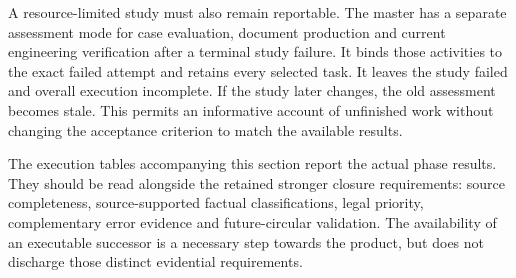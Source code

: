 A resource-limited study must also remain reportable. The master has a separate
assessment mode for case evaluation, document production and current engineering
verification after a terminal study failure. It binds those activities to the
exact failed attempt and retains every selected task. It leaves the study
failed and overall execution incomplete. If the study later changes, the old
assessment becomes stale. This permits an informative account of unfinished
work without changing the acceptance criterion to match the available results.

The execution tables accompanying this section report the actual phase results.
They should be read alongside the retained stronger closure requirements:
source completeness, source-supported factual classifications, legal priority,
complementary error evidence and future-circular validation. The availability
of an executable successor is a necessary step towards the product, but does
not discharge those distinct evidential requirements.
